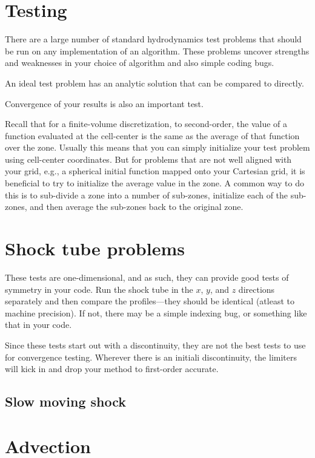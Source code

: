 \section{Testing}

There are a large number of standard hydrodynamics test problems that
should be run on any implementation of an algorithm.  These problems
uncover strengths and weaknesses in your choice of algorithm and also
simple coding bugs.

An ideal test problem has an analytic solution that can be compared to
directly.

Convergence of your results is also an important test.

Recall that for a finite-volume discretization, to second-order, the
value of a function evaluated at the cell-center is the same as the
average of that function over the zone.  Usually this means that you
can simply initialize your test problem using cell-center coordinates.
But for problems that are not well aligned with your grid, e.g., a
spherical initial function mapped onto your Cartesian grid, it is
beneficial to try to initialize the average value in the zone.  A
common way to do this is to sub-divide a zone into a number of
sub-zones, initialize each of the sub-zones, and then average the
sub-zones back to the original zone.  


\section{Shock tube problems}


These tests are one-dimensional, and as such, they can provide good
tests of symmetry in your code.  Run the shock tube in the $x$, $y$,
and $z$ directions separately and then compare the profiles---they
should be identical (atleast to machine precision).  If not, there may
be a simple indexing bug, or something like that in your code.

Since these tests start out with a discontinuity, they are not the
best tests to use for convergence testing.  Wherever there is an
initiali discontinuity, the limiters will kick in and drop your
method to first-order accurate.


\subsection{Slow moving shock}


\section{Advection}


